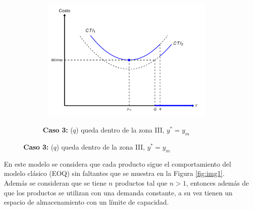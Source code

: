 \begin{figure}[h!]
    \begin{subfigure}[b]{1\textwidth} %
        \caption{\textbf{Caso 3:} ($q$) queda dentro de la zona III, $y^* = y_m$}
        \includegraphics[width=13cm, height=6.1cm]{images/img6.pdf}
        \label{fig:img4c}
    \end{subfigure}
    \label{fig:img4}
\end{figure}

\newpage
{}
En este modelo se considera que cada producto sigue el comportamiento del modelo clásico (EOQ) sin faltantes que se muestra en la Figura \ref{fig:img1}. Además se consideran que se tiene $n$ productos tal que $n>1$, entonces además de que los productos se utilizan con una demanda constante, a su vez tienen un espacio de almacenamiento con un límite de capacidad.

